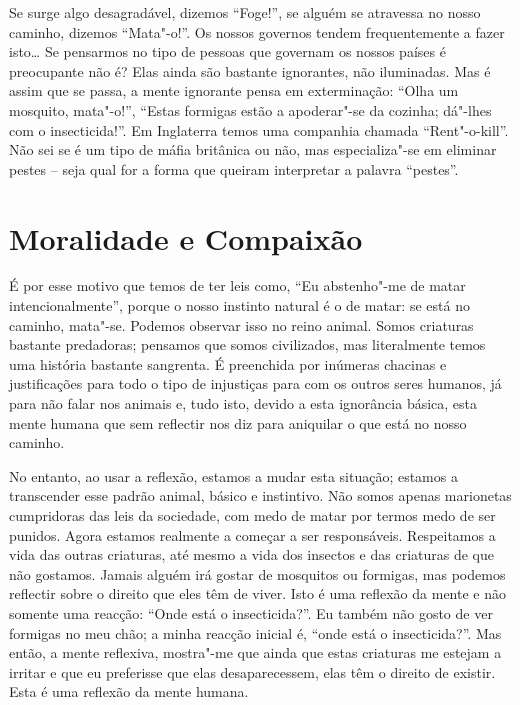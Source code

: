 Se surge algo desagradável, dizemos “Foge!”, se alguém se atravessa no nosso
caminho, dizemos “Mata"-o!”. Os nossos governos tendem frequentemente a fazer
isto\ldots{} Se pensarmos no tipo de pessoas que governam os nossos países é
preocupante não é? Elas ainda são bastante ignorantes, não iluminadas. Mas é
assim que se passa, a mente ignorante pensa em exterminação: “Olha um mosquito,
mata"-o!”, “Estas formigas estão a apoderar"-se da cozinha; dá"-lhes com o
insecticida!”. Em Inglaterra temos uma companhia chamada “Rent"-o-kill”. Não sei
se é um tipo de máfia britânica ou não, mas especializa"-se em eliminar pestes –
seja qual for a forma que queiram interpretar a palavra “pestes”.

\section{Moralidade e Compaixão}

É por esse motivo que temos de ter leis como, “Eu abstenho"-me de matar
intencionalmente”, porque o nosso instinto natural é o de matar: se está no
caminho, mata"-se. Podemos observar isso no reino animal. Somos criaturas
bastante predadoras; pensamos que somos civilizados, mas literalmente temos uma
história bastante sangrenta. É preenchida por inúmeras chacinas e justificações
para todo o tipo de injustiças para com os outros seres humanos, já para não
falar nos animais e, tudo isto, devido a esta ignorância básica, esta mente
humana que sem reflectir nos diz para aniquilar o que está no nosso caminho.

No entanto, ao usar a reflexão, estamos a mudar esta situação; estamos a
transcender esse padrão animal, básico e instintivo. Não somos apenas marionetas
cumpridoras das leis da sociedade, com medo de matar por termos medo de ser
punidos. Agora estamos realmente a começar a ser responsáveis. Respeitamos a
vida das outras criaturas, até mesmo a vida dos insectos e das criaturas de que
não gostamos. Jamais alguém irá gostar de mosquitos ou formigas, mas podemos
reflectir sobre o direito que eles têm de viver. Isto é uma reflexão da mente e
não somente uma reacção: “Onde está o insecticida?”. Eu também não gosto de ver
formigas no meu chão; a minha reacção inicial é, “onde está o insecticida?”. Mas
então, a mente reflexiva, mostra"-me que ainda que estas criaturas me estejam a
irritar e que eu preferisse que elas desaparecessem, elas têm o direito de existir.
Esta é uma reflexão da mente humana.

